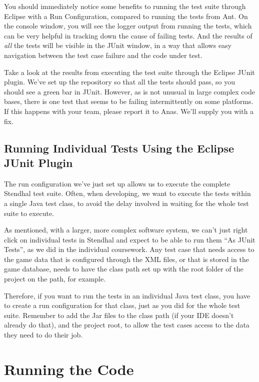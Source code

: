 \documentclass[
]{book}
\begin{document}
You should immediately notice some benefits to running the test suite through Eclipse with a Run Configuration, compared to running the tests from Ant. On the console window, you will see the logger output from running the tests, which can be very helpful in tracking down the cause of failing tests. And the results of \emph{all} the tests will be visible in the JUnit window, in a way that allows easy navigation between the test case failure and the code under test.

Take a look at the results from executing the test suite through the Eclipse JUnit plugin. We've set up the repository so that all the tests should pass, so you should see a green bar in JUnit. However, as is not unusual in large complex code bases, there is one test that seems to be failing intermittently on some platforms. If this happens with your team, please report it to Anas. We'll supply you with a fix.

\hypertarget{eclipsej}{%
\subsection{Running Individual Tests Using the Eclipse JUnit Plugin}\label{eclipsej}}

The run configuration we've just set up allows us to execute the complete Stendhal test suite. Often, when developing, we want to execute the tests within a single Java test class, to avoid the delay involved in waiting for the whole test suite to execute.

As mentioned, with a larger, more complex software system, we can't just right click on individual tests in Stendhal and expect to be able to run them ``As JUnit Tests'', as we did in the individual coursework. Any test case that needs access to the game data that is configured through the XML files, or that is stored in the game database, needs to have the class path set up with the root folder of the project on the path, for example.

Therefore, if you want to run the tests in an individual Java test class, you have to create a run configuration for that class, just as you did for the whole test suite. Remember to add the Jar files to the class path (if your IDE doesn't already do that), and the project root, to allow the test cases access to the data they need to do their job.

\hypertarget{coderunning}{%
\section{Running the Code}\label{coderunning}}
\end{document}
